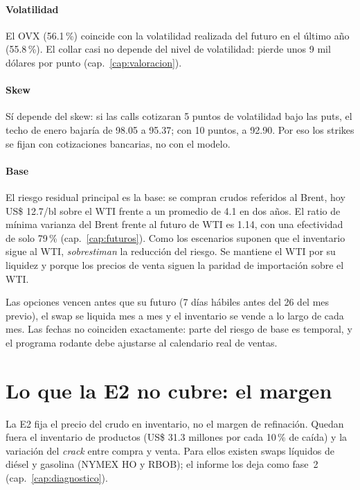 \paragraph{Volatilidad} El OVX (56.1\,\%) coincide con la volatilidad realizada del futuro en el último año (55.8\,\%). El collar casi no depende del nivel de volatilidad: pierde unos 9 mil dólares por punto (cap.~\ref{cap:valoracion}).

\paragraph{Skew} Sí depende del skew: si las calls cotizaran 5 puntos de volatilidad bajo las puts, el techo de enero bajaría de 98.05 a 95.37; con 10 puntos, a 92.90. Por eso los strikes se fijan con cotizaciones bancarias, no con el modelo.

\paragraph{Base} El riesgo residual principal es la base: se compran crudos referidos al Brent, hoy US\$ 12.7/bl sobre el WTI frente a un promedio de 4.1 en dos años. El ratio de mínima varianza del Brent frente al futuro de WTI es 1.14, con una efectividad de solo 79\,\% (cap.~\ref{cap:futuros}). Como los escenarios suponen que el inventario sigue al WTI, \emph{sobrestiman} la reducción del riesgo. Se mantiene el WTI por su liquidez y porque los precios de venta siguen la paridad de importación sobre el WTI.

\begin{cuidado}
Las opciones vencen antes que su futuro (7 días hábiles antes del 26 del mes previo), el swap se liquida mes a mes y el inventario se vende a lo largo de cada mes. Las fechas no coinciden exactamente: parte del riesgo de base es temporal, y el programa rodante debe ajustarse al calendario real de ventas.
\end{cuidado}

\section{Lo que la E2 no cubre: el margen}

La E2 fija el precio del crudo en inventario, no el margen de refinación. Quedan fuera el inventario de productos (US\$ 31.3 millones por cada 10\,\% de caída) y la variación del \emph{crack} entre compra y venta. Para ellos existen swaps líquidos de diésel y gasolina (NYMEX HO y RBOB); el informe los deja como fase~2 (cap.~\ref{cap:diagnostico}).

